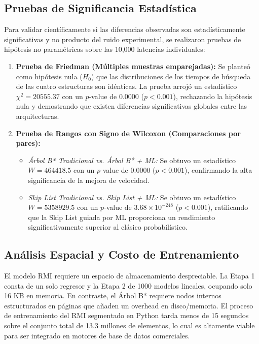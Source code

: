 \documentclass[twocolumn,10pt,journal]{IEEEtran}
\begin{document}
\subsection{Pruebas de Significancia Estad\'istica}
Para validar cient\'ificamente si las diferencias observadas son estad\'isticamente significativas y no producto del ruido experimental, se realizaron pruebas de hip\'otesis no param\'etricas sobre las 10,000 latencias individuales:
\begin{enumerate}
    \item \textbf{Prueba de Friedman (M\'ultiples muestras emparejadas):} Se plante\'o como hip\'otesis nula ($H_0$) que las distribuciones de los tiempos de b\'usqueda de las cuatro estructuras son id\'enticas. La prueba arroj\'o un estad\'istico $\chi^2 = 20555.37$ con un $p$-value de $0.0000$ ($p < 0.001$), rechazando la hip\'otesis nula y demostrando que existen diferencias significativas globales entre las arquitecturas.
    \item \textbf{Prueba de Rangos con Signo de Wilcoxon (Comparaciones por pares):} 
    \begin{itemize}
        \item \textit{\'Arbol B* Tradicional vs. \'Arbol B* + ML:} Se obtuvo un estad\'istico $W = 464418.5$ con un $p$-value de $0.0000$ ($p < 0.001$), confirmando la alta significancia de la mejora de velocidad.
        \item \textit{Skip List Tradicional vs. Skip List + ML:} Se obtuvo un estad\'istico $W = 5358929.5$ con un $p$-value de $3.68 \times 10^{-248}$ ($p < 0.001$), ratificando que la Skip List guiada por ML proporciona un rendimiento significativamente superior al cl\'asico probabil\'istico.
    \end{itemize}
\end{enumerate}

\subsection{An\'alisis Espacial y Costo de Entrenamiento}
El modelo RMI requiere un espacio de almacenamiento despreciable. La Etapa 1 consta de un solo regresor y la Etapa 2 de 1000 modelos lineales, ocupando solo 16 KB en memoria. En contraste, el \'Arbol B* requiere nodos internos estructurados en p\'aginas que a\~naden un overhead en disco/memoria. El proceso de entrenamiento del RMI segmentado en Python tarda menos de 15 segundos sobre el conjunto total de 13.3 millones de elementos, lo cual es altamente viable para ser integrado en motores de base de datos comerciales.
\end{document}
